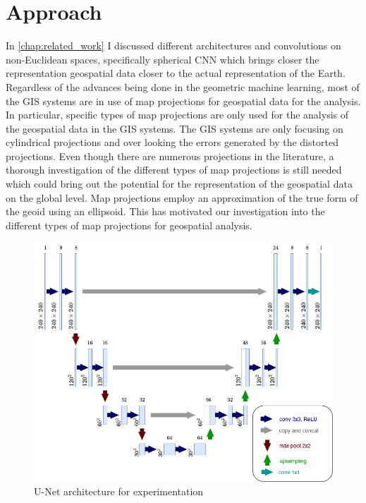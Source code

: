 \clearpage
\cleardoublepage

\chapter{Approach}
\label{chap:approach}
In  \autoref{chap:related_work} I discussed different architectures and convolutions on non-Euclidean spaces, specifically spherical CNN which brings closer the
representation geospatial data closer to the actual representation of the Earth. Regardless of the advances being done in the geometric machine learning,
most of the GIS systems are in use of map projections for geospatial data for the analysis. In particular, specific types of map projections are only used for
the analysis of the geospatial data in the GIS systems. The GIS systems are only focusing on cylindrical projections and over looking the errors generated by
the distorted projections. Even though there are numerous projections in the literature, a thorough investigation of the different types of map projections is still
needed which could bring out the potential for the representation of the geospatial data on the global level. Map projections employ an approximation of the true form
of the geoid using an ellipsoid. This has motivated our investigation into the different types of map projections for geospatial analysis.

\begin{figure}[h]
    \centering
    \includegraphics[width=1.0\linewidth]{figures/chapter-5/my_unet.png}
    \caption{U-Net architecture for experimentation }
    \label{fig:self-unet}
\end{figure}

